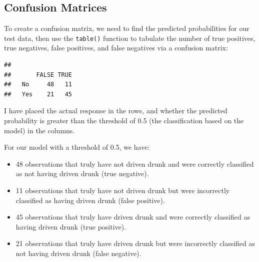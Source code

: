 \documentclass[
]{book}
\newenvironment{Shaded}{\begin{snugshade}}{\end{snugshade}}
\newcommand{\AttributeTok}[1]{\textcolor[rgb]{0.13,0.29,0.53}{#1}}
\newcommand{\DocumentationTok}[1]{\textcolor[rgb]{0.56,0.35,0.01}{\textbf{\textit{#1}}}}
\newcommand{\FloatTok}[1]{\textcolor[rgb]{0.00,0.00,0.81}{#1}}
\newcommand{\FunctionTok}[1]{\textcolor[rgb]{0.13,0.29,0.53}{\textbf{#1}}}
\newcommand{\NormalTok}[1]{#1}
\newcommand{\OtherTok}[1]{\textcolor[rgb]{0.56,0.35,0.01}{#1}}
\newcommand{\SpecialCharTok}[1]{\textcolor[rgb]{0.81,0.36,0.00}{\textbf{#1}}}
\newcommand{\StringTok}[1]{\textcolor[rgb]{0.31,0.60,0.02}{#1}}
\providecommand{\tightlist}{%
  \setlength{\itemsep}{0pt}\setlength{\parskip}{0pt}}
\begin{document}
\hypertarget{confusion-matrices}{%
\subsection*{Confusion Matrices}\label{confusion-matrices}}

To create a confusion matrix, we need to find the predicted probabilities for our test data, then use the \texttt{table()} function to tabulate the number of true positives, true negatives, false positives, and false negatives via a confusion matrix:

\begin{Shaded}
\end{Shaded}

\begin{verbatim}
##      
##       FALSE TRUE
##   No     48   11
##   Yes    21   45
\end{verbatim}

I have placed the actual response in the rows, and whether the predicted probability is greater than the threshold of 0.5 (the classification based on the model) in the columns.

For our model with a threshold of 0.5, we have:

\begin{itemize}
\tightlist
\item
  48 observations that truly have not driven drunk and were correctly classified as not having driven drunk (true negative).
\item
  11 observations that truly have not driven drunk but were incorrectly classified as having driven drunk (false positive).
\item
  45 observations that truly have driven drunk and were correctly classified as having driven drunk (true positive).
\item
  21 observations that truly have driven drunk but were incorrectly classified as not having driven drunk (false negative).
\end{itemize}
\end{document}
